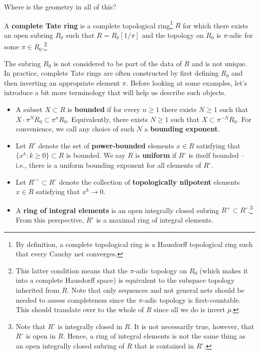 \documentclass[11pt]{article}
\begin{document}
Where is the geometry in all of this?

\begin{definition}
A \textbf{complete Tate ring} is a complete topological ring\footnote{By definition, a complete topological ring is a Hausdorff topological ring such that every Cauchy net converges.} $R$ for which there exists an open subring $R_0$ such that $R=R_0[1/\pi]$ and the topology on $R_0$ is $\pi$-adic for some $\pi\in R_0$.\footnote{This latter condition means that the $\pi$-adic topology on $R_0$ (which makes it into a complete Hausdorff space) is equivalent to the subspace topology inherited from $R$. Note that only sequences and not general nets should be needed to assess completeness since the $\pi$-adic topology is first-countable. This should translate over to the whole of $R$ since all we do is invert $p$.}
\end{definition}

The subring $R_0$ is not considered to be part of the data of $R$ and is not unique. In practice, complete Tate rings are often constructed by first defining $R_0$ and then inverting an appropriate element $\pi$. Before looking at some examples, let's introduce a bit more terminology that will help us describe such objects.

\begin{definition}
\hfill
\begin{itemize}
\item A subset $X\subset R$ is \textbf{bounded} if for every $n\geq1$ there exists $N\geq1$ such that $X\cdot\pi^NR_0\subset\pi^nR_0$. Equivalently, there exists $N\geq1$ such that $X\subset\pi^{-N}R_0$. For convenience, we call any choice of such $N$ a \textbf{bounding exponent}.

\item Let $R^{\circ}$ denote the set of \textbf{power-bounded} elements $x\in R$ satisfying that $\{x^k : k\geq0\}\subset R$ is bounded. We say $R$ is \textbf{uniform} if $R^{\circ}$ is itself bounded -- i.e., there is a uniform bounding exponent for all elements of $R^{\circ}$.

\item Let $R^{\circ\circ}\subset R^{\circ}$ denote the collection of \textbf{topologically nilpotent} elements $x\in R$ satisfying that $x^k\to0$.

\item A \textbf{ring of integral elements} is an open integrally closed subring $R^+\subset R^{\circ}$.\footnote{Note that $R^{\circ}$ is integrally closed in $R$. It is not necessarily true, however, that $R^{\circ}$ is open in $R$. Hence, a ring of integral elements is not the same thing as an open integrally closed subring of $R$ that is contained in $R^{\circ}$.} From this perspective, $R^{\circ}$ is a maximal ring of integral elements.
\end{itemize}
\end{definition}
\end{document}
